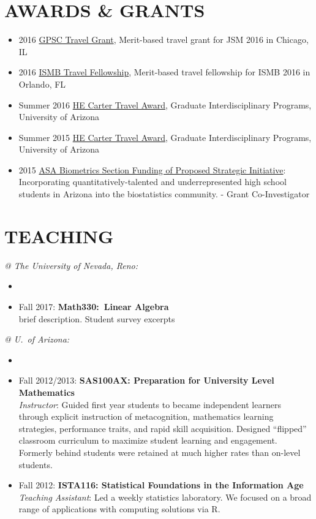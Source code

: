 \documentclass[paper=a4,fontsize=11pt]{scrartcl} %
\newcommand{\NewPart}[2]{\section*{\uppercase{#1} #2 }}
\newcommand{\CourseEntry}[3]{
		\noindent \item{#1: \textbf{#2} \\ #3}}
\begin{document}

\NewPart{Awards \& Grants}{}
\vspace{-7pt}
\begin{itemize}[noitemsep]
\item 2016 \href{http://gpsc.arizona.edu/travel-grants}{GPSC Travel Grant}, Merit-based travel grant for JSM 2016 in Chicago, IL
\item 2016 \href{https://www.iscb.org/ismb2016-submission/ismb2016-travel-fellowship-2}{ISMB Travel Fellowship}, Merit-based travel fellowship for ISMB 2016 in Orlando, FL
\item Summer 2016 \href{https://gidp.arizona.edu/carter-travel-award/award-recipients}{HE Carter Travel Award}, Graduate Interdisciplinary Programs, University of Arizona 
\item Summer 2015 \href{https://gidp.arizona.edu/carter-travel-award/award-recipients}{HE Carter Travel Award}, Graduate Interdisciplinary Programs, University of Arizona 
\item 2015 \href{http://stattrak.amstat.org/2014/03/01/grant-opportunity}{ASA Biometrics Section Funding of Proposed Strategic Initiative}:  Incorporating quantitatively-talented and underrepresented high school students in Arizona into the biostatistics community. - Grant Co-Investigator
\vspace{-7pt}
\end{itemize}

\NewPart{Teaching}{}
\vspace{-7pt}
\textit{@ The University of Nevada, Reno:}
\begin{itemize}[noitemsep]
\item[]
\vspace{-15pt}

\CourseEntry{Fall 2017}{Math330:~Linear Algebra}{brief description. Student survey excerpts}{}

\end{itemize}


\noindent\textit{@ U.~of Arizona:}
\begin{itemize}[noitemsep]
\item[]
\vspace{-15pt}

\CourseEntry{Fall 2012/2013}{SAS100AX: Preparation for University Level Mathematics}{\textit{Instructor}: Guided first year students to became independent learners through explicit instruction of metacognition, mathematics learning strategies, performance traits, and rapid skill acquisition. Designed ``flipped'' classroom curriculum to maximize student learning and engagement. Formerly behind students were retained at much higher rates than on-level students.}
\CourseEntry{Fall 2012}{ISTA116: Statistical Foundations in the Information Age}{\textit{Teaching Assistant}: Led a weekly statistics laboratory. We focused on a broad range of applications with computing solutions via \textsc{R}.}

\end{itemize}
\end{document}
